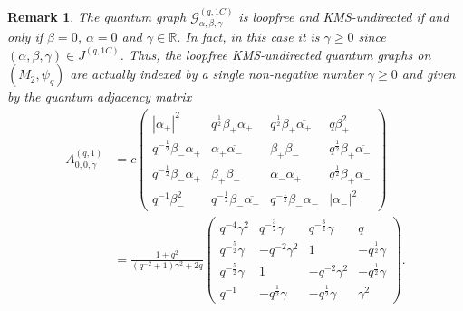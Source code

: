 \documentclass{amsart}
\newtheorem{remark}[thm]{Remark}
\newcommand{\R}{\mathbb{R}}
\begin{document}
\begin{remark}
\label{ntg::rmk:KMS-undirected_qgraphs_with_one_edge_on_(M2,psi_q)}
    The quantum graph $\mathcal{G}_{\alpha, \beta, \gamma}^{(q,1C)}$ is loopfree and KMS-undirected if and only if $\beta = 0$, $\alpha = 0$ and $\gamma \in \R$. In fact, in this case it is $\gamma \geq 0$ since $(\alpha, \beta, \gamma) \in J^{(q, 1C)}$. Thus, the loopfree KMS-undirected quantum graphs on $(M_2, \psi_q)$ are actually indexed by a single non-negative number $\gamma \geq 0$ and given by the quantum adjacency matrix
    \begin{align*}
        A_{0,0,\gamma}^{(q,1)} &= c \begin{pmatrix}
            |\alpha_+|^2     & q^{\frac{1}{2}} \beta_+ \alpha_+            & q^{\frac{1}{2}}\beta_+ \overline{\alpha_+}              & q \beta_+^2            \\
            q^{-\frac{1}{2}} \beta_- \alpha_+ & \alpha_+ \overline{\alpha_-} & \beta_+ \beta_-                           & q^{\frac{1}{2}}\beta_+ \overline{\alpha_-}   \\
            q^{-\frac{1}{2}}\beta_- \overline{\alpha_+} & \beta_+ \beta_-                          & \alpha_- \overline{\alpha_+}   & q^{\frac{1}{2}}\beta_+ \alpha_-   \\
            q^{-1}\beta_-^2         & q^{-\frac{1}{2}}\beta_- \overline{\alpha_-}            & q^{-\frac{1}{2}} \beta_- \alpha_-              & |\alpha_-|^2
        \end{pmatrix} \\
        &= \frac{1+q^2}{(q^{-2}+1)\gamma^2+2q} \begin{pmatrix}
            q^{-4} \gamma^2 & q^{-\frac{3}{2}} \gamma & q^{-\frac{3}{2}} \gamma & q \\
            q^{-\frac{5}{2}} \gamma & - q^{-2} \gamma^2 & 1 & -q^{\frac{1}{2}} \gamma \\
            q^{-\frac{5}{2}} \gamma & 1 & - q^{-2} \gamma^2 & -q^{\frac{1}{2}} \gamma \\
            q^{-1} & -q^{\frac{1}{2}} \gamma & -q^{\frac{1}{2}} \gamma & \gamma^2
        \end{pmatrix}.
    \end{align*}
\end{remark}
\end{document}
